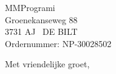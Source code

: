 \documentclass[]{scrlttr2}
\begin{document}
  \begin{letter}{
    MMProgrami\\
    Groenekanseweg 88\\
    3731 AJ \ DE BILT\\
    Ordernummer: NP-30028502
  }
    \opening{}
    \urentable
		\closing{Met vriendelijke groet,}
  \end{letter}
\end{document}
